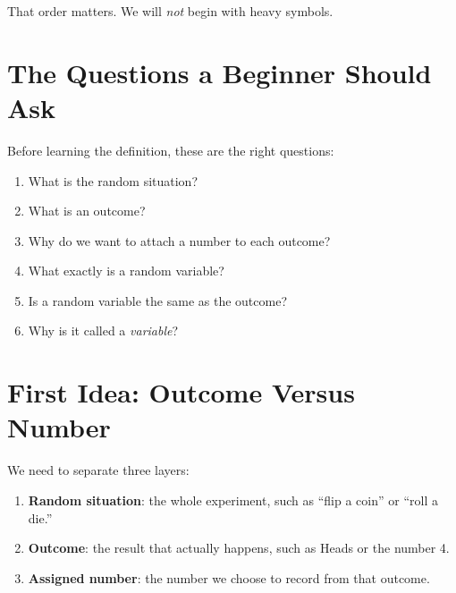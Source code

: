 \documentclass[11pt,a4paper]{article}
\begin{document}
That order matters. We will \emph{not} begin with heavy symbols.

\section{The Questions a Beginner Should Ask}

Before learning the definition, these are the right questions:

\begin{enumerate}
  \item What is the random situation?
  \item What is an outcome?
  \item Why do we want to attach a number to each outcome?
  \item What exactly is a random variable?
  \item Is a random variable the same as the outcome?
  \item Why is it called a \emph{variable}?
\end{enumerate}

\section{First Idea: Outcome Versus Number}

We need to separate three layers:

\begin{enumerate}
  \item \textbf{Random situation}: the whole experiment, such as ``flip a coin'' or ``roll a die.''
  \item \textbf{Outcome}: the result that actually happens, such as Heads or the number 4.
  \item \textbf{Assigned number}: the number we choose to record from that outcome.
\end{enumerate}

\begin{center}
\end{center}
\end{document}
